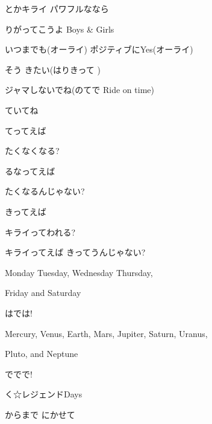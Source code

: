 \documentclass[14pt]{ltjsarticle}
\begin{document}
{  とかキライ パワフルななら
  \jisho{}

  りがってこうよ Boys \& Girls
  \jisho{}

  いつまでも(オーライ) ポジティブにYes(オーライ)
  \jisho{}

  そう きたい(はりきって )
  \jisho{}

  ジャマしないでね(のてで Ride on time)
  \jisho{}

  ていてね
  \jisho{}

\item
  てってえば
  \jisho{}

  たくなくなる?
  \jisho{}

  るなってえば
  \jisho{}

  たくなるんじゃない?
  \jisho{}

  きってえば
  \jisho{}

  キライってわれる?
  \jisho{}

  キライってえば きってうんじゃない?
  \jisho{}

\item
  \jisho{}

  Monday Tuesday, Wednesday Thursday,
  \jisho{}

  Friday and Saturday
  \jisho{}

  はでは!
  \jisho{}

  \jisho{}

  Mercury, Venus, Earth, Mars, Jupiter, Saturn, Uranus,
  \jisho{}

  Pluto, and Neptune
  \jisho{}

  ででで!
  \jisho{}

  く☆レジェンドDays
  \jisho{}

\item
  からまで にかせて
  \jisho{}

}
\end{document}
